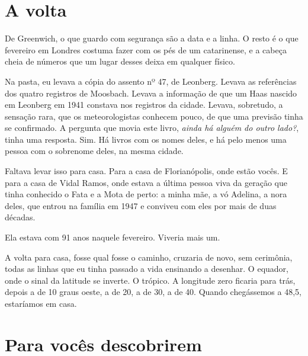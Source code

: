 \documentclass[
  brazilian,
  11pt,
  openany]{book}
\begin{document}
\section{A volta}\label{a-volta}

De Greenwich, o que guardo com segurança são a data e a linha. O resto é
o que fevereiro em Londres costuma fazer com os pés de um catarinense, e
a cabeça cheia de números que um lugar desses deixa em qualquer físico.

Na pasta, eu levava a cópia do assento nº 47, de Leonberg. Levava as
referências dos quatro registros de Moosbach. Levava a informação de que
um Haas nascido em Leonberg em 1941 constava nos registros da cidade.
Levava, sobretudo, a sensação rara, que os meteorologistas conhecem
pouco, de que uma previsão tinha se confirmado. A pergunta que movia
este livro, \emph{ainda há alguém do outro lado?}, tinha uma resposta.
Sim. Há livros com os nomes deles, e há pelo menos uma pessoa com o
sobrenome deles, na mesma cidade.

Faltava levar isso para casa. Para a casa de Florianópolis, onde estão
vocês. E para a casa de Vidal Ramos, onde estava a última pessoa viva da
geração que tinha conhecido o Fata e a Mota de perto: a minha mãe, a vó
Adelina, a nora deles, que entrou na família em 1947 e conviveu com eles
por mais de duas décadas.

Ela estava com 91 anos naquele fevereiro. Viveria mais um.

A volta para casa, fosse qual fosse o caminho, cruzaria de novo, sem
cerimônia, todas as linhas que eu tinha passado a vida ensinando a
desenhar. O equador, onde o sinal da latitude se inverte. O trópico. A
longitude zero ficaria para trás, depois a de 10 graus oeste, a de 20, a
de 30, a de 40. Quando chegássemos a 48,5, estaríamos em casa.

\section{Para vocês descobrirem}\label{para-vocuxeas-descobrirem-18}
\end{document}
